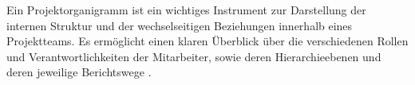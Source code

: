 Ein Projektorganigramm ist ein wichtiges Instrument zur Darstellung der internen Struktur und der wechselseitigen Beziehungen innerhalb eines Projektteams. Es ermöglicht einen klaren Überblick über die verschiedenen Rollen und Verantwortlichkeiten der Mitarbeiter, sowie deren Hierarchieebenen und deren jeweilige Berichtswege \cite{projektmanagement-definitionen:2009}.